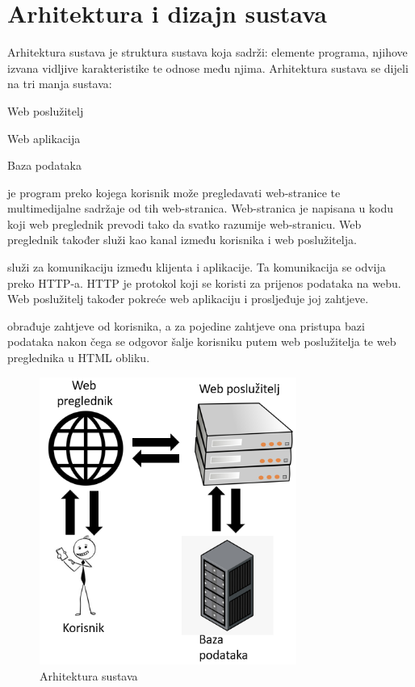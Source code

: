 \chapter{Arhitektura i dizajn sustava}
		
		

		Arhitektura sustava je struktura sustava koja sadrži: elemente programa, njihove izvana vidljive karakteristike te odnose među njima.
		Arhitektura sustava se dijeli na tri manja sustava:
		\begin{packed_item}
			\item[$\bullet$] Web poslužitelj
			\item[$\bullet$] Web aplikacija
			\item[$\bullet$] Baza podataka
		\end{packed_item}
		
	
		
		 je program preko kojega korisnik može pregledavati web-stranice te multimedijalne sadržaje od tih web-stranica. Web-stranica je napisana u kodu koji web preglednik prevodi tako da svatko razumije web-stranicu. Web preglednik također služi kao kanal između korisnika i web poslužitelja.
		
		
		 služi za komunikaciju između klijenta i aplikacije. Ta komunikacija se odvija preko HTTP-a. HTTP je protokol koji se koristi za prijenos podataka na webu. Web poslužitelj također pokreće web aplikaciju i prosljeđuje joj zahtjeve.
		
		
		 obrađuje zahtjeve od korisnika, a za pojedine zahtjeve ona pristupa bazi podataka nakon čega se odgovor šalje korisniku putem web poslužitelja te web preglednika u HTML obliku.


		\begin{figure}[H]
			\centering
			\includegraphics[width=0.75\textwidth]{slike/arhitektura_sustava.PNG} 
			\caption{Arhitektura sustava}
			\label{fig:promjene1} 
		\end{figure}
		
